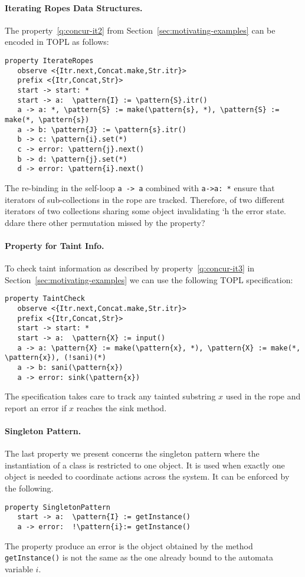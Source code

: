 \documentclass{article} %
\newcommand{\noterg}[2]{\textcolor{gray}{[\textcolor{red}{#1}: #2]}}
\newcommand{\dd}[1]{\noterg{dd}{#1}}
\newcommand{\delimitVerbatim}{\par\nobreak\medskip\noindent}
\newcommand{\pattern}[1]{\ensuremath{\mathtt{\underline{#1}}}}
\theoremstyle{definition}
\theoremstyle{remark}
\begin{document}
\paragraph{Iterating Ropes Data Structures.} %
The property~\eqref{q:concur-it2} from Section~\ref{sec:motivating-examples} can be encoded in TOPL as follows:
%
{\small
\delimitVerbatim
\begin{Verbatim}[commandchars=\\\{\}]
 property IterateRopes
   observe <{Itr.next,Concat.make,Str.itr}>
   prefix <{Itr,Concat,Str}>
   start -> start: *
   start -> a:  \pattern{I} := \pattern{S}.itr()
   a -> a: *, \pattern{S} := make(\pattern{s}, *), \pattern{S} := make(*, \pattern{s})
   a -> b: \pattern{J} := \pattern{s}.itr()
   b -> c: \pattern{i}.set(*)
   c -> error: \pattern{j}.next()
   b -> d: \pattern{j}.set(*)
   d -> error: \pattern{i}.next()
\end{Verbatim}
\delimitVerbatim}%
The re-binding in the self-loop {\tt a -> a} combined with {\tt a->a: *} ensure that iterators of sub-collections in the rope are tracked. Therefore,
of two different iterators of two collections sharing some object invalidating `h the error state. 
\\dd{are there other permutation missed by the property?}

\paragraph{Property for Taint Info.} %
To check taint information as described by property~\eqref{q:concur-it3} in Section~\ref{sec:motivating-examples} we can use the following
TOPL specification:
{\small
\delimitVerbatim
\begin{Verbatim}[commandchars=\\\{\}]
 property TaintCheck
   observe <{Itr.next,Concat.make,Str.itr}>
   prefix <{Itr,Concat,Str}>
   start -> start: *
   start -> a:  \pattern{X} := input()
   a -> a: \pattern{X} := make(\pattern{x}, *), \pattern{X} := make(*, \pattern{x}), (!sani)(*)
   a -> b: sani(\pattern{x})
   a -> error: sink(\pattern{x})
\end{Verbatim}
\delimitVerbatim}%
The specification takes care to track  any tainted substring $x$ used in the rope and report an error if $x$ reaches the sink method.

\paragraph{Singleton Pattern.} 
The last property we present concerns 
the singleton pattern where the instantiation of a class is restricted to one object. It is used when exactly one object is needed to coordinate actions across the system. It can be enforced by the following.
{\small
\delimitVerbatim
\begin{Verbatim}[commandchars=\\\{\}]
 property SingletonPattern
   start -> a:  \pattern{I} := getInstance()
   a -> error:  !\pattern{i}:= getInstance()
\end{Verbatim}
\delimitVerbatim}%
The property produce an error is the object obtained by the method {\tt getInstance()} is not the same as the one already bound to the automata variable $i$.
\end{document}
